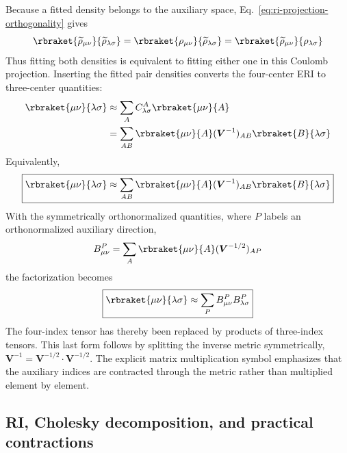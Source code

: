 \documentclass[11pt,a4paper,titlepage]{article}
\numberwithin{equation}{section}
\newcommand{\bV}{\boldsymbol{V}}
\begin{document}
Because a fitted density belongs to the auxiliary space,
Eq.~\eqref{eq:ri-projection-orthogonality} gives
\begin{equation}
 \rbraket{\widetilde\rho_{\mu\nu}}{\widetilde\rho_{\lambda\sigma}}
 =\rbraket{\rho_{\mu\nu}}{\widetilde\rho_{\lambda\sigma}}
 =\rbraket{\widetilde\rho_{\mu\nu}}{\rho_{\lambda\sigma}}
\end{equation}
Thus fitting both densities is equivalent to fitting either one in this
Coulomb projection. Inserting the fitted pair densities converts the
four-center ERI to three-center quantities:
\begin{equation}
\begin{split}
 \rbraket{\mu\nu}{\lambda\sigma}
 &\approx\sum_A C_{\lambda\sigma}^A\rbraket{\mu\nu}{A}\\
 &=\sum_{AB}\rbraket{\mu\nu}{A}(\bV^{-1})_{AB}
 \rbraket{B}{\lambda\sigma}
\end{split}
\end{equation}
Equivalently,
\begin{equation}
  \boxed{
 \rbraket{\mu\nu}{\lambda\sigma}
 \approx\sum_{AB}\rbraket{\mu\nu}{A}(\bV^{-1})_{AB}
 \rbraket{B}{\lambda\sigma}
  }
\end{equation}
With the symmetrically orthonormalized quantities, where $P$ labels an
orthonormalized auxiliary direction,
\begin{equation}
 B_{\mu\nu}^P=\sum_A\rbraket{\mu\nu}{A}(\bV^{-1/2})_{AP}
\end{equation}
the factorization becomes
\begin{equation}
  \boxed{
 \rbraket{\mu\nu}{\lambda\sigma}
 \approx\sum_PB_{\mu\nu}^PB_{\lambda\sigma}^P
  }
\end{equation}
The four-index tensor has thereby been replaced by products of three-index
tensors.
This last form follows by splitting the inverse metric symmetrically,
$\bV^{-1}=\bV^{-1/2}\cdot\bV^{-1/2}$. The explicit matrix multiplication
symbol emphasizes that the auxiliary indices are contracted through the
metric rather than multiplied element by element.

\subsection{RI, Cholesky decomposition, and practical contractions}
\end{document}
